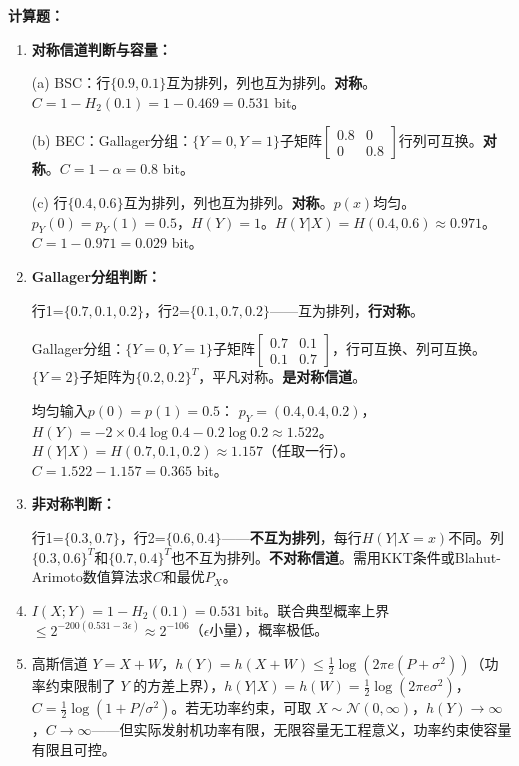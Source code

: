 \documentclass[12pt,a4paper]{ctexart}
\begin{document}
\textbf{计算题：}
\begin{enumerate}[leftmargin=*]

\item[(1)] \textbf{对称信道判断与容量：}

(a) BSC：行$\{0.9,0.1\}$互为排列，列也互为排列。\textbf{对称}。$C = 1-H_2(0.1) = 1-0.469 = 0.531$ bit。

(b) BEC：Gallager分组：$\{Y=0,Y=1\}$子矩阵$\begin{bmatrix}0.8&0\\0&0.8\end{bmatrix}$行列可互换。\textbf{对称}。$C = 1-\alpha = 0.8$ bit。

(c) 行$\{0.4,0.6\}$互为排列，列也互为排列。\textbf{对称}。$p(x)$均匀。$p_Y(0)=p_Y(1)=0.5$，$H(Y)=1$。$H(Y|X)=H(0.4,0.6)\approx0.971$。$C=1-0.971=0.029$ bit。

\item[(2)] \textbf{Gallager分组判断：}

行1=$\{0.7,0.1,0.2\}$，行2=$\{0.1,0.7,0.2\}$——互为排列，\textbf{行对称}。

Gallager分组：$\{Y=0,Y=1\}$子矩阵$\begin{bmatrix}0.7&0.1\\0.1&0.7\end{bmatrix}$，行可互换、列可互换。$\{Y=2\}$子矩阵为$\{0.2,0.2\}^T$，平凡对称。\textbf{是对称信道}。

均匀输入$p(0)=p(1)=0.5$：
$p_Y=(0.4, 0.4, 0.2)$，$H(Y)=-2\times0.4\log 0.4-0.2\log 0.2\approx1.522$。
$H(Y|X)=H(0.7,0.1,0.2)\approx1.157$（任取一行）。
$C=1.522-1.157=0.365$ bit。

\item[(3)] \textbf{非对称判断：}

行1=$\{0.3,0.7\}$，行2=$\{0.6,0.4\}$——\textbf{不互为排列}，每行$H(Y|X=x)$不同。列$\{0.3,0.6\}^T$和$\{0.7,0.4\}^T$也不互为排列。\textbf{不对称信道}。需用KKT条件或Blahut-Arimoto数值算法求$C$和最优$P_X$。

\item[(4)] $I(X;Y)=1-H_2(0.1)=0.531$ bit。联合典型概率上界$\leq2^{-200(0.531-3\epsilon)}\approx2^{-106}$（$\epsilon$小量），概率极低。

\item[(5)] 高斯信道 $Y=X+W$，$h(Y)=h(X+W)\leq\frac12\log(2\pi e(P+\sigma^2))$（功率约束限制了 $Y$ 的方差上界），$h(Y|X)=h(W)=\frac12\log(2\pi e\sigma^2)$，$C=\frac12\log(1+P/\sigma^2)$。若无功率约束，可取 $X\sim\mathcal{N}(0,\infty)$，$h(Y)\to\infty$，$C\to\infty$——但实际发射机功率有限，无限容量无工程意义，功率约束使容量有限且可控。
\end{enumerate}
\end{document}
